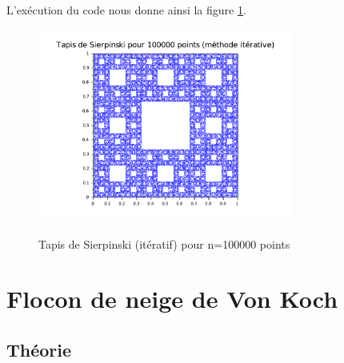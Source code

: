\documentclass[a4paper,10pt]{report}
\begin{document}
L'exécution du code nous donne ainsi la figure \ref{tapis_it}.
\begin{figure}[H]
\centering
\caption{Tapis de Sierpinski (itératif) pour n=100000 points}
\includegraphics[width=0.75\textwidth]{tapis_iteratif.pdf}
\label{tapis_it}
\end{figure}


\section{Flocon de neige de Von Koch}
\subsection{Théorie}
\end{document}
